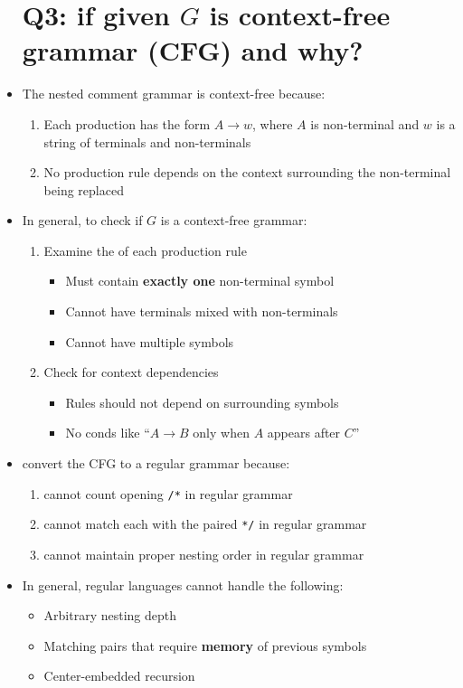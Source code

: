 \documentclass[10pt,a4paper,landscape]{article}
\begin{document}
\begin{multicols*}{3}
\begin{itemize}
\section*{Q3: if given $G$ is context-free grammar (CFG) and why?}
\item The nested comment grammar is context-free because:
  \begin{enumerate}
  \item Each production has the form $A\to w$, where $A$ is non-terminal and $w$ is a string of terminals and non-terminals
  \item No production rule depends on the context surrounding the non-terminal being replaced
  \end{enumerate}
\item In general, to check if $G$ is a context-free grammar:
  \begin{enumerate}
  \item Examine the  of each production rule
    \begin{itemize}
    \item Must contain \textbf{exactly one} non-terminal symbol
    \item Cannot have terminals mixed with non-terminals
    \item Cannot have multiple symbols
    \end{itemize}
  \item Check for context dependencies
    \begin{itemize}
    \item Rules should not depend on surrounding symbols
    \item No conds like ``$A\to B$ only when $A$ appears after $C$''
    \end{itemize}
  \end{enumerate}
\item {} convert the CFG to a regular grammar because:
  \begin{enumerate}
  \item cannot count opening \texttt{/*} in regular grammar
  \item cannot match each with the paired \texttt{*/} in regular grammar
  \item cannot maintain proper nesting order in regular grammar
  \end{enumerate}
\item In general, regular languages cannot handle the following:
  \begin{itemize}[leftmargin=1em]
  \item Arbitrary nesting depth
  \item Matching pairs that require \textbf{memory} of previous symbols
  \item Center-embedded recursion
  \end{itemize}
\end{itemize}


\end{multicols*}
\end{document}
